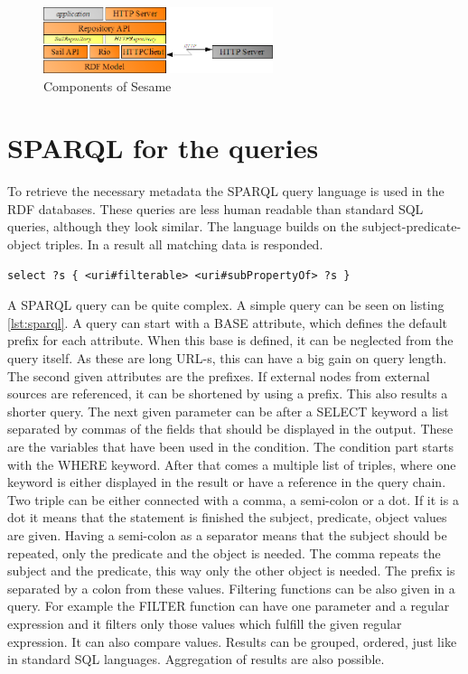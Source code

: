 \begin{figure}[h]
\centering
\includegraphics[width=0.6\textwidth]{figures/sesame-components.png}
\caption{Components of Sesame\label{fig:sesame}}
\end{figure}

\section{SPARQL for the queries}

To retrieve the necessary metadata the SPARQL query language is used in the RDF databases. These queries are less human readable than standard SQL queries, although they look similar. The language builds on the subject-predicate-object triples. In a result all matching data is responded. 

\begin{lstlisting}[caption={Sample SPARQL that queries all filterable objects\label{lst:sparql}}]
select ?s { <uri#filterable> <uri#subPropertyOf> ?s }
\end{lstlisting}

A SPARQL query can be quite complex. A simple query can be seen on listing \ref{lst:sparql}. A query can start with a BASE attribute, which defines the default prefix for each attribute. When this base is defined, it can be neglected from the query itself. As these are long URL-s, this can have a big gain on query length. The second given attributes are the prefixes. If external nodes from external sources are referenced, it can be shortened by using a prefix. This also results a shorter query. The next given parameter can be after a SELECT keyword a list separated by commas of the fields that should be displayed in the output. These are the variables that have been used in the condition. 
The condition part starts with the WHERE keyword. After that comes a multiple list of triples, where one keyword is either displayed in the result or have a reference in the query chain. Two triple can be either connected with a comma, a semi-colon or a dot. If it is a dot it means that the statement is finished the subject, predicate, object values are given. Having a semi-colon as a separator means that the subject should be repeated, only the predicate and the object is needed. The comma repeats the subject and the predicate, this way only the other object is needed. The prefix is separated by a colon from these values. Filtering functions can be also given in a query. For example the FILTER function can have one parameter and a regular expression and it filters only those values which fulfill the given regular expression. It can also compare values. Results can be grouped, ordered, just like in standard SQL languages. Aggregation of results are also possible. 

